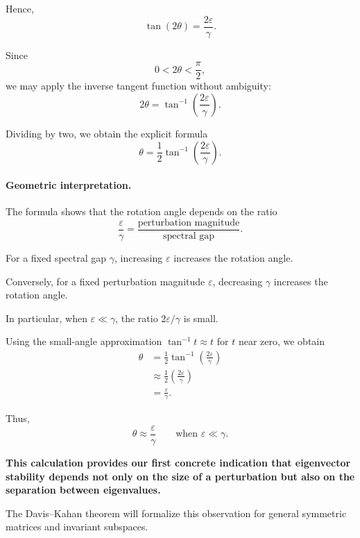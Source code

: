 \documentclass[14pt,letterpaper]{article}
\theoremstyle{plain}
\theoremstyle{definition}
\theoremstyle{remark}
\begin{document}
Hence,
\[
\boxed{
\tan(2\theta)=\frac{2\varepsilon}{\gamma}.
}
\]

Since
\[
0<2\theta<\frac{\pi}{2},
\]
we may apply the inverse tangent function
without ambiguity:
\[
2\theta
=
\tan^{-1}\left(\frac{2\varepsilon}{\gamma}\right).
\]

Dividing by two, we obtain the explicit formula
\[
\boxed{
\theta
=
\frac12
\tan^{-1}\left(\frac{2\varepsilon}{\gamma}\right).
}
\]

\paragraph{Geometric interpretation.}

The formula shows that the rotation angle depends
on the ratio
\[
\boxed{
\frac{\varepsilon}{\gamma}
=
\frac{\text{perturbation magnitude}}
{\text{spectral gap}}.
}
\]

For a fixed spectral gap $\gamma$, increasing
$\varepsilon$ increases the rotation angle.

Conversely, for a fixed perturbation magnitude
$\varepsilon$, decreasing $\gamma$ increases
the rotation angle.

In particular, when $\varepsilon\ll\gamma$,
the ratio $2\varepsilon/\gamma$ is small.

Using the small-angle approximation
$\tan^{-1} t\approx t$ for $t$ near zero,
we obtain
\[
\begin{aligned}
\theta
&=
\frac12
\tan^{-1}\left(\frac{2\varepsilon}{\gamma}\right)\\
&\approx
\frac12\left(\frac{2\varepsilon}{\gamma}\right)\\
&=
\frac{\varepsilon}{\gamma}.
\end{aligned}
\]

Thus,
\[
\boxed{
\theta\approx\frac{\varepsilon}{\gamma}
\qquad\text{when }\varepsilon\ll\gamma.
}
\]

\textbf{This calculation provides our first concrete
indication that eigenvector stability depends
not only on the size of a perturbation but also
on the separation between eigenvalues.}

The Davis--Kahan theorem will formalize this
observation for general symmetric matrices
and invariant subspaces.
\end{document}
